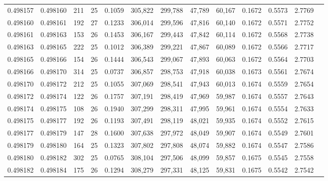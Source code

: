 \begin{tabular}{rrrrrrrrrrrrr}
0.498157 & 0.498160 & 211 &  25 &                                     0.1059 & 305,822 & 299,788 &  47,789 &  60,167 & 0.1672 & 0.5573 & 2.7769 \\
0.498160 & 0.498161 & 192 &  27 &                                     0.1233 & 306,014 & 299,596 &  47,816 &  60,140 & 0.1672 & 0.5571 & 2.7752 \\
0.498161 & 0.498163 & 153 &  26 &                                     0.1453 & 306,167 & 299,443 &  47,842 &  60,114 & 0.1672 & 0.5568 & 2.7738 \\
0.498163 & 0.498165 & 222 &  25 &                                     0.1012 & 306,389 & 299,221 &  47,867 &  60,089 & 0.1672 & 0.5566 & 2.7717 \\
0.498165 & 0.498166 & 154 &  26 &                                     0.1444 & 306,543 & 299,067 &  47,893 &  60,063 & 0.1672 & 0.5564 & 2.7703 \\
0.498166 & 0.498170 & 314 &  25 &                                     0.0737 & 306,857 & 298,753 &  47,918 &  60,038 & 0.1673 & 0.5561 & 2.7674 \\
0.498170 & 0.498172 & 212 &  25 &                                     0.1055 & 307,069 & 298,541 &  47,943 &  60,013 & 0.1674 & 0.5559 & 2.7654 \\
0.498172 & 0.498174 & 122 &  26 &                                     0.1757 & 307,191 & 298,419 &  47,969 &  59,987 & 0.1674 & 0.5557 & 2.7643 \\
0.498174 & 0.498175 & 108 &  26 &                                     0.1940 & 307,299 & 298,311 &  47,995 &  59,961 & 0.1674 & 0.5554 & 2.7633 \\
0.498175 & 0.498177 & 192 &  26 &                                     0.1193 & 307,491 & 298,119 &  48,021 &  59,935 & 0.1674 & 0.5552 & 2.7615 \\
0.498177 & 0.498179 & 147 &  28 &                                     0.1600 & 307,638 & 297,972 &  48,049 &  59,907 & 0.1674 & 0.5549 & 2.7601 \\
0.498179 & 0.498180 & 164 &  25 &                                     0.1323 & 307,802 & 297,808 &  48,074 &  59,882 & 0.1674 & 0.5547 & 2.7586 \\
0.498180 & 0.498182 & 302 &  25 &                                     0.0765 & 308,104 & 297,506 &  48,099 &  59,857 & 0.1675 & 0.5545 & 2.7558 \\
0.498182 & 0.498184 & 175 &  26 &                                     0.1294 & 308,279 & 297,331 &  48,125 &  59,831 & 0.1675 & 0.5542 & 2.7542 \\

\end{tabular}
